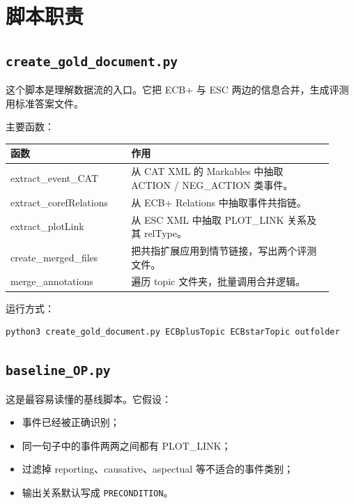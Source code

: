 \documentclass[11pt,a4paper,fontset=fandol]{ctexart}
\newcommand{\code}[1]{\texttt{#1}}
\begin{document}
\section{脚本职责}

\subsection{\code{create\_gold\_document.py}}

这个脚本是理解数据流的入口。它把 ECB+ 与 ESC 两边的信息合并，生成评测用标准答案文件。

主要函数：

\begin{longtable}{>{\ttfamily}p{0.34\linewidth}p{0.58\linewidth}}
\toprule
\normalfont 函数 & 作用 \\
\midrule
extract\_event\_CAT & 从 CAT XML 的 Markables 中抽取 ACTION / NEG\_ACTION 类事件。 \\
extract\_corefRelations & 从 ECB+ Relations 中抽取事件共指链。 \\
extract\_plotLink & 从 ESC XML 中抽取 PLOT\_LINK 关系及其 relType。 \\
create\_merged\_files & 把共指扩展应用到情节链接，写出两个评测文件。 \\
merge\_annotations & 遍历 topic 文件夹，批量调用合并逻辑。 \\
\bottomrule
\end{longtable}

运行方式：

\begin{lstlisting}[language=bash]
python3 create_gold_document.py ECBplusTopic ECBstarTopic outfolder
\end{lstlisting}

\subsection{\code{baseline\_OP.py}}

这是最容易读懂的基线脚本。它假设：

\begin{itemize}[leftmargin=2em]
  \item 事件已经被正确识别；
  \item 同一句子中的事件两两之间都有 PLOT\_LINK；
  \item 过滤掉 reporting、causative、aspectual 等不适合的事件类别；
  \item 输出关系默认写成 \code{PRECONDITION}。
\end{itemize}
\end{document}
